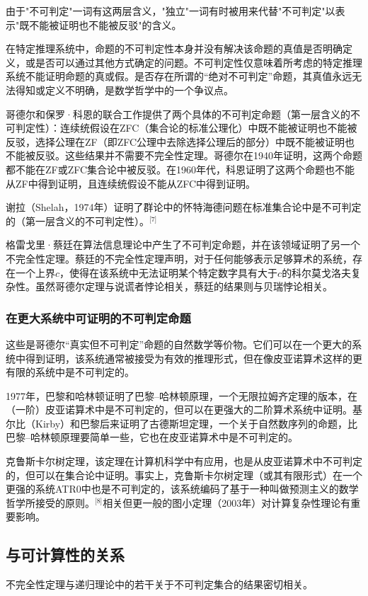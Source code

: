 由于"不可判定"一词有这两层含义，"独立"一词有时被用来代替"不可判定"以表示"既不能被证明也不能被反驳"的含义。

在特定推理系统中，命题的不可判定性本身并没有解决该命题的真值是否明确定义，或是否可以通过其他方式确定的问题。不可判定性仅意味着所考虑的特定推理系统不能证明命题的真或假。是否存在所谓的“绝对不可判定”命题，其真值永远无法得知或定义不明确，是数学哲学中的一个争议点。

哥德尔和保罗·科恩的联合工作提供了两个具体的不可判定命题（第一层含义的不可判定性）：连续统假设在ZFC（集合论的标准公理化）中既不能被证明也不能被反驳，选择公理在ZF（即ZFC公理中去除选择公理后的部分）中既不能被证明也不能被反驳。这些结果并不需要不完全性定理。哥德尔在1940年证明，这两个命题都不能在ZF或ZFC集合论中被反驳。在1960年代，科恩证明了这两个命题也不能从ZF中得到证明，且连续统假设不能从ZFC中得到证明。

谢拉（Shelah，1974年）证明了群论中的怀特海德问题在标准集合论中是不可判定的（第一层含义的不可判定性）。\(^\text{[7]}\)

格雷戈里·蔡廷在算法信息理论中产生了不可判定命题，并在该领域证明了另一个不完全性定理。蔡廷的不完全性定理声明，对于任何能够表示足够算术的系统，存在一个上界\( c \)，使得在该系统中无法证明某个特定数字具有大于\( c \)的科尔莫戈洛夫复杂性。虽然哥德尔定理与说谎者悖论相关，蔡廷的结果则与贝瑞悖论相关。
\subsubsection{在更大系统中可证明的不可判定命题}
这些是哥德尔“真实但不可判定”命题的自然数学等价物。它们可以在一个更大的系统中得到证明，该系统通常被接受为有效的推理形式，但在像皮亚诺算术这样的更有限的系统中是不可判定的。

1977年，巴黎和哈林顿证明了巴黎–哈林顿原理，一个无限拉姆齐定理的版本，在（一阶）皮亚诺算术中是不可判定的，但可以在更强大的二阶算术系统中证明。基尔比（Kirby）和巴黎后来证明了古德斯坦定理，一个关于自然数序列的命题，比巴黎–哈林顿原理要简单一些，它也在皮亚诺算术中是不可判定的。

克鲁斯卡尔树定理，该定理在计算机科学中有应用，也是从皮亚诺算术中不可判定的，但可以在集合论中证明。事实上，克鲁斯卡尔树定理（或其有限形式）在一个更强的系统ATR0中也是不可判定的，该系统编码了基于一种叫做预测主义的数学哲学所接受的原则。\(^\text{[8]}\)相关但更一般的图小定理（2003年）对计算复杂性理论有重要影响。
\subsection{与可计算性的关系}  
不完全性定理与递归理论中的若干关于不可判定集合的结果密切相关。

